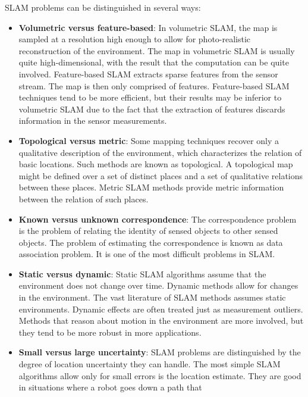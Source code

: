 SLAM problems can be distinguished in several ways:
\begin{itemize}
    \item \textbf{Volumetric versus feature-based}: In volumetric SLAM,
        the map is sampled at a resolution high enough to allow for
        photo-realistic reconstruction of the environment.
        The map in volumetric SLAM is usually quite high-dimensional,
        with the result that the computation can be quite involved.
        Feature-based SLAM extracts sparse features from the sensor stream.
        The map is then only comprised of features.
        Feature-based SLAM techniques tend to be more efficient,
        but their results may be inferior to volumetric SLAM due to the
        fact that the extraction of features discards information
        in the sensor measurements.
    \item \textbf{Topological versus metric}: Some mapping techniques recover
        only a qualitative description of the environment, which
        characterizes the relation of basic locations.
        Such methods are known as topological.
        A topological map might be defined over a set of distinct places
        and a set of qualitative relations between these places.
        Metric SLAM methods provide metric information between the
        relation of such places.
    \item \textbf{Known versus unknown correspondence}: The correspondence
        problem is the problem of relating the identity of sensed objects
        to other sensed objects.
        The problem of estimating the correspondence is known as
        data association problem.
        It is one of the most difficult problems in SLAM.
    \item \textbf{Static versus dynamic}: Static SLAM algorithms assume
        that the environment does not change over time.
        Dynamic methods allow for changes in the environment.
        The vast literature of SLAM methods assumes static environments.
        Dynamic effects are often treated just as measurement outliers.
        Methods that reason about motion in the environment are more involved,
        but they tend to be more robust in more applications.
    \item \textbf{Small versus large uncertainty}: SLAM problems are
        distinguished by the degree of location uncertainty they can handle.
        The most simple SLAM algorithms allow only for small errors is the
        location estimate.
        They are good in situations where a robot goes down a path that

\end{itemize}
